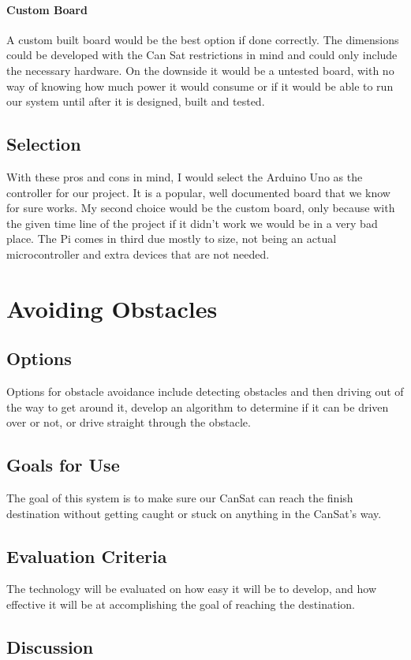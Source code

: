 \documentclass[10pt,letterpaper,onecolumn,journal]{IEEEtran}
\begin{document}
\paragraph{Custom Board}
A custom built board would be the best option if done correctly. The dimensions could be developed with the Can Sat restrictions in mind and could only include the necessary hardware. On the downside it would be a untested board, with no way of knowing how much power it would consume or if it would be able to run our system until after it is designed, built and tested.
\subsection{Selection}
With these pros and cons in mind, I would select the Arduino Uno as the controller for our project. It is a popular, well documented board that we know for sure works. My second choice would be the custom board, only because with the given time line of the project if it didn't work we would be in a very bad place. The Pi comes in third due mostly to size, not being an actual microcontroller and extra devices that are not needed.

	
\section{Avoiding Obstacles}
\subsection{Options}
Options for obstacle avoidance include detecting obstacles and then driving out of the way to get around it, develop an algorithm to determine if it can be driven over or not, or drive straight through the obstacle.
\subsection{Goals for Use}
The goal of this system is to make sure our CanSat can reach the finish destination without getting caught or stuck on anything in the CanSat's way.
\subsection{Evaluation Criteria}
The technology will be evaluated on how easy it will be to develop, and how effective it will be at accomplishing the goal of reaching the destination. 
\subsection{Discussion}
\end{document}
